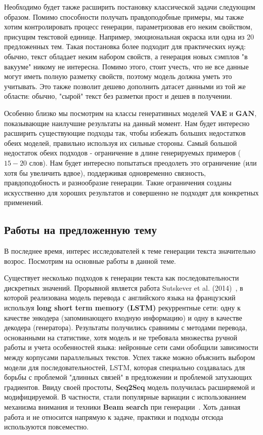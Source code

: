 \documentclass{spbau-diploma}
\begin{document}
Необходимо будет также расширить постановку классической задачи следующим 
образом. Помимо способности получать правдоподобные примеры, мы также хотим
контролировать процесс генерации, параметризовав его неким свойством, 
присущим текстовой единице. Например, эмоциональная окраска или одна из $20$ 
предложенных тем. Такая постановка более подходит для практических нужд: 
обычно, текст обладает неким набором свойств, а генерация новых сэмплов 
"в вакууме" никому не интересна. Помимо этого, стоит учесть, что не все данные
могут иметь полную разметку свойств, поэтому модель должна уметь это учитывать.
Это также позволит дешево дополнить датасет данными из той же области: обычно, 
"сырой" текст без разметки прост и дешев в получении.

Особенно близко мы посмотрим на классы генеративных моделей \textbf{VAE} и 
$\textbf{GAN}$, показывающие наилучшие результаты на данный момент. Нам будет
интересно расширить существующие подходы так, чтобы избежать больших недостатков
обеих моделей, правильно используя их сильные стороны. Самый большой недостаток
обеих подходов - ограничение в длине генерируемых примеров ($15-20$ слов). Нам
будет интересно попытаться преодолеть это ограничение (или хотя бы увеличить 
вдвое), поддерживая одновременно связность, правдоподобность и разнообразие 
генерации. Такие ограничения созданы искусственно для хороших результатов и 
совершенно не подходят для конкретных применений.

\subsection{Работы на предложенную тему}
В последнее время, интерес исследователей к теме генерации текста значительно
возрос. Посмотрим на основные работы в данной теме.

Существует несколько подходов к генерации текста как последовательности
дискретных значений. Прорывной является работа 
Sutskever et al. (2014)~\cite{1409.3215}, в которой реализована модель перевода 
с английского языка на французский используя 
\textbf{long short term memory (LSTM)} рекуррентные сети:
одну к качестве энкодера (запоминающего входную информацию) и одну в качестве 
декодера (генератора). Результаты получились сравнимы с методами перевода,
основанными на статистике, хотя модель и не требовала множества ручной работы и
учета особенностей языка: нейронные сети сами обобщили зависимости между 
корпусами параллельных текстов. Успех также можно объяснить выбором модели для
последовательностей, LSTM, которая специально создавалась для борьбы с проблемой
"длинных связей" в предложении и проблемой затухающих градиентов. Ввиду своей
простоты, \textbf{Seq2Seq} модель получилась расширяемой и модифицируемой. В 
частности, стали популярные вариации с использованием механизма внимания и 
техники \textbf{Beam search} при генерации~\cite{blog:seq2seq}. Хоть данная 
работа и не относится напрямую к задаче, практики и подходы отсюда используются
повсеместно.
\end{document}
